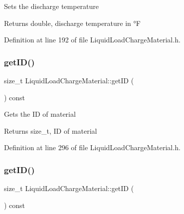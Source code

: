 Sets the discharge temperature \begin{DoxyReturn}{Returns}
double, discharge temperature in °F 
\end{DoxyReturn}


Definition at line 192 of file Liquid\+Load\+Charge\+Material.\+h.

\mbox{\label{class_liquid_load_charge_material_a07e869cabd98a5179536559a1c0f4b35}} 
\subsubsection{\texorpdfstring{get\+I\+D()}{getID()}\hspace{0.1cm}{\footnotesize\ttfamily [1/3]}}
{\footnotesize\ttfamily size\+\_\+t Liquid\+Load\+Charge\+Material\+::get\+ID (\begin{DoxyParamCaption}{ }\end{DoxyParamCaption}) const\hspace{0.3cm}{\ttfamily [inline]}}

Gets the ID of material \begin{DoxyReturn}{Returns}
size\+\_\+t, ID of material 
\end{DoxyReturn}


Definition at line 296 of file Liquid\+Load\+Charge\+Material.\+h.

\mbox{\label{class_liquid_load_charge_material_a07e869cabd98a5179536559a1c0f4b35}} 
\subsubsection{\texorpdfstring{get\+I\+D()}{getID()}\hspace{0.1cm}{\footnotesize\ttfamily [2/3]}}
{\footnotesize\ttfamily size\+\_\+t Liquid\+Load\+Charge\+Material\+::get\+ID (\begin{DoxyParamCaption}{ }\end{DoxyParamCaption}) const\hspace{0.3cm}{\ttfamily [inline]}}

